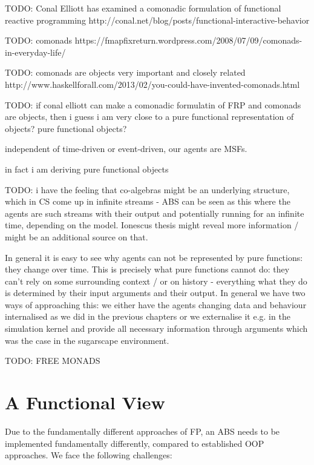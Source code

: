 TODO: Conal Elliott has examined a comonadic formulation of functional reactive programming http://conal.net/blog/posts/functional-interactive-behavior

TODO: comonads https://fmapfixreturn.wordpress.com/2008/07/09/comonads-in-everyday-life/

TODO: comonads are objects very important and closely related http://www.haskellforall.com/2013/02/you-could-have-invented-comonads.html

TODO: if conal elliott can make a comonadic formulatin of FRP and comonads are objects, then i guess i am very close to a pure functional representation of objects? pure functional objects?


independent of time-driven or event-driven, our agents are MSFs.

in fact i am deriving pure functional objects

TODO: i have the feeling that co-algebras might be an underlying structure, which in CS come up in infinite streams - ABS can be seen as this where the agents are such streams with their output and potentially running for an infinite time, depending on the model. Ionescus thesis might reveal more information / might be an additional source on that.

In general it is easy to see why agents can not be represented by pure functions: they change over time. This is precisely what pure functions cannot do: they can't rely on some surrounding context / or on history - everything what they do is determined by their input arguments and their output. In general we have two ways of approaching this: we either have the agents changing data and behaviour internalised as we did in the previous chapters or we externalise it e.g. in the simulation kernel and provide all necessary information through arguments which was the case in the sugarscape environment.

TODO: FREE MONADS %

\section{A Functional View}
Due to the fundamentally different approaches of FP, an ABS needs to be implemented fundamentally differently, compared to established OOP approaches. We face the following challenges:

